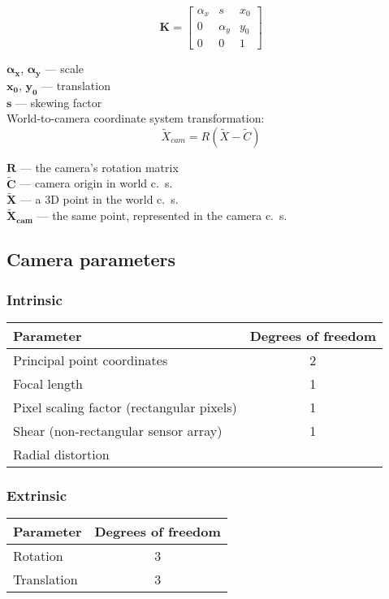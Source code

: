 \documentclass{article}
\begin{document}
    \[
        \mathbf{K} = \begin{bmatrix}
            \alpha_x & s & x_0 \\
            0 & \alpha_y & y_0 \\
            0 & 0 & 1
        \end{bmatrix}
    \]

    \noindent $\mathbf{\alpha_x}$, $\mathbf{\alpha_y}$ --- scale \\
    $\mathbf{x_0}$, $\mathbf{y_0}$ --- translation \\
    $\mathbf{s}$ --- skewing factor \\

    \noindent World-to-camera coordinate system transformation:
    \[
        \tilde{X}_{cam} = R(\tilde{X} - \tilde{C})
    \]

    \noindent $\mathbf{R}$ --- the camera's rotation matrix \\
    $\mathbf{\tilde{C}}$ --- camera origin in world c.\ s. \\
    $\mathbf{\tilde{X}}$ --- a 3D point in the world c.\ s. \\
    $\mathbf{\tilde{X}_{cam}}$ --- the same point, represented in the camera c.\ s. \\

    \subsection{Camera parameters}
        \subsubsection{Intrinsic}
        \begin{center}
            \begin{tabular}{l c}
                Parameter & Degrees of freedom \\
                \hline  %
                Principal point coordinates & 2 \\
                Focal length & 1 \\
                Pixel scaling factor (rectangular pixels) & 1 \\
                Shear (non-rectangular sensor array) & 1 \\
                Radial distortion
            \end{tabular}
        \end{center}

        \subsubsection{Extrinsic}
        \begin{center}
            \begin{tabular}{l c}
                Parameter & Degrees of freedom \\
                \hline  %
                Rotation & 3 \\
                Translation & 3
            \end{tabular}
        \end{center}
\end{document}
